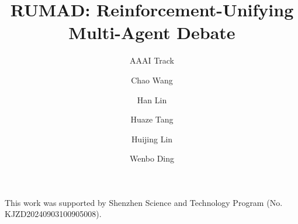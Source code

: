 \documentclass[sigconf]{aamas}
\title[RUMAD]{RUMAD: Reinforcement-Unifying Multi-Agent Debate}
\subtitle{AAAI Track}
\author{Chao Wang}
\affiliation{
  \institution{Tsinghua University}
  \city{Shenzhen}
  \country{China}}
\author{Han Lin}
\affiliation{
  \institution{Zhejiang University}
  \city{Hangzhou}
  \country{China}}
\affiliation{
  \institution{Tsinghua University}
  \city{Shenzhen}
  \country{China}}
\author{Huaze Tang}
\affiliation{
  \institution{Tsinghua University}
  \city{Shenzhen}
  \country{China}}
\author{Huijing Lin}
\affiliation{
  \institution{Tsinghua University}
  \city{Shenzhen}
  \country{China}}
\author{Wenbo Ding}
\affiliation{
  \institution{Tsinghua University}
  \city{Shenzhen}
  \country{China}}
\begin{document}

\pagestyle{fancy}
\fancyhead{}


\maketitle 








\begin{acks}
This work was supported by Shenzhen Science and Technology Program (No. KJZD20240903100905008).

\end{acks}



 


\newpage
\onecolumn
\appendix

\end{document}
